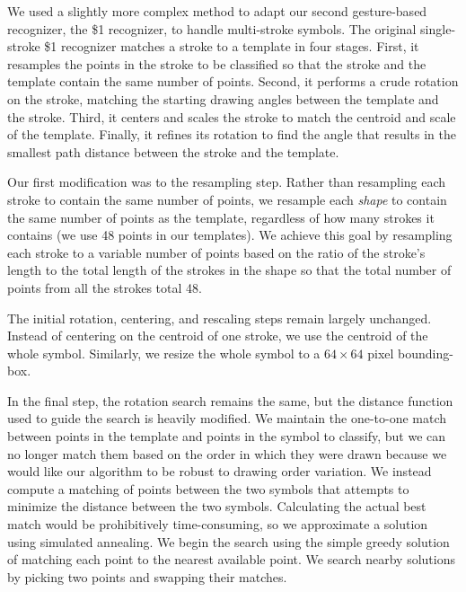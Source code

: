 \documentclass{egpubl}
\begin{document}
We used a slightly more complex method to adapt our second gesture-based recognizer, the \$1 recognizer,
to handle multi-stroke symbols.
The original single-stroke \$1 recognizer matches a stroke to a template in four stages.   
First, it resamples the points in the 
stroke to be classified so that the stroke and the template contain the same number of points.  Second, it performs 
a crude rotation on the stroke, matching the starting drawing angles between the template and the stroke.  Third, it centers and scales the stroke to match the centroid and scale of the template.  Finally, it refines its rotation to find the angle that results in the smallest path distance between the stroke and the template. 


Our first modification was to the resampling step.  Rather than resampling each stroke to contain the same number of points, we resample each \textit{shape} to contain the same number of points as the template, regardless of how many strokes it contains (we use 48 points in our templates).   We achieve this goal by resampling each stroke to a variable number of points based on the ratio of the stroke's length to the total length of the strokes in the shape so that the total number of points from all the strokes total 48. 

The initial rotation, centering, and rescaling steps remain largely unchanged. Instead of centering on the centroid of one stroke, we use the centroid of the whole symbol. Similarly, we resize the whole symbol to a  $64\times 64$ pixel bounding-box.


In the final step, the rotation search remains the same, but the distance function used to guide the search is heavily modified.  We maintain the one-to-one match between points in the template and points in the symbol to classify, but we can no longer match them based on the order in which they were drawn because we would like our algorithm to be robust to drawing order variation.   We instead compute a matching of points between the two symbols that attempts to minimize the distance between the two symbols. Calculating the actual best match would be prohibitively time-consuming, so we approximate a solution using simulated annealing. We begin the search using the simple greedy solution of matching each point to the nearest available point. We search nearby solutions by picking two points and swapping their matches.
\end{document}
